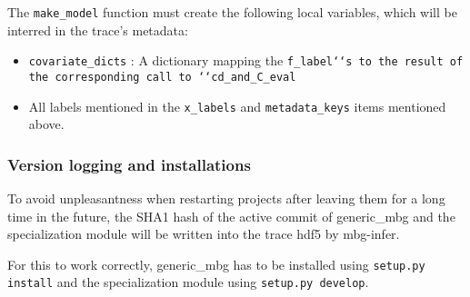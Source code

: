 The \texttt{make{\_}model} function must create the following local variables, which will be interred
in the trace's metadata:
\begin{itemize}
\item {} 
\texttt{covariate{\_}dicts} : A dictionary mapping the \texttt{f{\_}label`{}`s to the result of the corresponding
call to `{}`cd{\_}and{\_}C{\_}eval}

\item {} 
All labels mentioned in the \texttt{x{\_}labels} and \texttt{metadata{\_}keys} items mentioned above.

\end{itemize}





\subsubsection{Version logging and installations}
\label{sec:version-logging-and-installations}

To avoid unpleasantness when restarting projects after leaving them for a long time in the future,
the SHA1 hash of the active commit of generic{\_}mbg and the specialization module will be written into
the trace hdf5 by mbg-infer.

For this to work correctly, generic{\_}mbg has to be installed using \texttt{setup.py install} and the
specialization module using \texttt{setup.py develop}.

